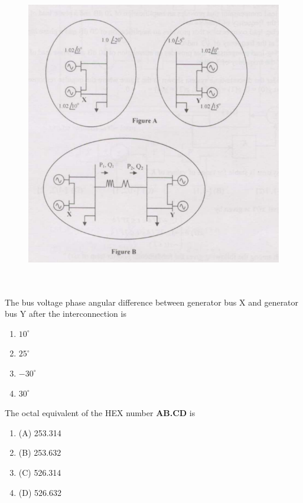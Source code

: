     \begin{figure}[!ht]
    \centering
    \includegraphics[width=\linewidth]{GATE-yearwise/GATE(1)/figs/15.png}
    \caption{}
    \label{fig:15}
    \end{figure}
    \\\\The bus voltage phase angular difference between generator bus X and generator bus Y after the interconnection is
    \begin{multicols}{4}
    \begin{enumerate}
        \item $10^\circ$
        \item $25^\circ$
        \item $-30^\circ$
        \item $30^\circ$
    \end{enumerate}
    \end{multicols}
    \bigskip
    \item The octal equivalent of the HEX number \textbf{AB.CD} is
    \begin{multicols}{4}
    \begin{enumerate}
        \item (A) 253.314
        \item (B) 253.632
        \item (C) 526.314
        \item (D) 526.632
    \end{enumerate}
    \end{multicols}
